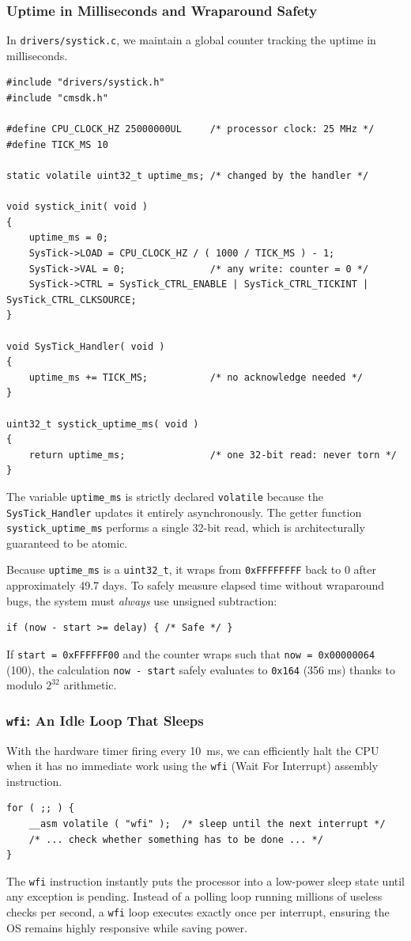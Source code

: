 \subsubsection{Uptime in Milliseconds and Wraparound Safety}
In \texttt{drivers/systick.c}, we maintain a global counter tracking the uptime in milliseconds. 
\begin{lstlisting}
#include "drivers/systick.h"
#include "cmsdk.h"

#define CPU_CLOCK_HZ 25000000UL     /* processor clock: 25 MHz */
#define TICK_MS 10

static volatile uint32_t uptime_ms; /* changed by the handler */

void systick_init( void )
{
    uptime_ms = 0;
    SysTick->LOAD = CPU_CLOCK_HZ / ( 1000 / TICK_MS ) - 1;
    SysTick->VAL = 0;               /* any write: counter = 0 */
    SysTick->CTRL = SysTick_CTRL_ENABLE | SysTick_CTRL_TICKINT | SysTick_CTRL_CLKSOURCE;
}

void SysTick_Handler( void )
{
    uptime_ms += TICK_MS;           /* no acknowledge needed */
}

uint32_t systick_uptime_ms( void )
{
    return uptime_ms;               /* one 32-bit read: never torn */
}
\end{lstlisting}

The variable \texttt{uptime\_ms} is strictly declared \texttt{volatile} because the \texttt{SysTick\_Handler} updates it entirely asynchronously. The getter function \texttt{systick\_uptime\_ms} performs a single 32-bit read, which is architecturally guaranteed to be atomic.

Because \texttt{uptime\_ms} is a \texttt{uint32\_t}, it wraps from \texttt{0xFFFFFFFF} back to 0 after approximately 49.7 days. To safely measure elapsed time without wraparound bugs, the system must \textit{always} use unsigned subtraction:
\begin{lstlisting}
if (now - start >= delay) { /* Safe */ }
\end{lstlisting}
If \texttt{start = 0xFFFFFF00} and the counter wraps such that \texttt{now = 0x00000064} (100), the calculation \texttt{now - start} safely evaluates to \texttt{0x164} (356 ms) thanks to modulo $2^{32}$ arithmetic.

\subsubsection{\texttt{wfi}: An Idle Loop That Sleeps}
With the hardware timer firing every 10~ms, we can efficiently halt the CPU when it has no immediate work using the \texttt{wfi} (Wait For Interrupt) assembly instruction. 
\begin{lstlisting}
for ( ;; ) {
    __asm volatile ( "wfi" );  /* sleep until the next interrupt */
    /* ... check whether something has to be done ... */
}
\end{lstlisting}
The \texttt{wfi} instruction instantly puts the processor into a low-power sleep state until any exception is pending. Instead of a polling loop running millions of useless checks per second, a \texttt{wfi} loop executes exactly once per interrupt, ensuring the OS remains highly responsive while saving power.

